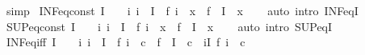 \begin{isabellebody}
\ simp%
\endisatagproof
{\isafoldproof}%
%
\isadelimproof
\isanewline
%
\endisadelimproof
\isanewline
{}\isamarkupfalse%
\ INF{\isacharunderscore}{\kern0pt}eq{\isacharunderscore}{\kern0pt}const{\isacharcolon}{\kern0pt}\ {\isachardoublequoteopen}I\ {\isasymnoteq}\ {\isacharbraceleft}{\kern0pt}{\isacharbraceright}{\kern0pt}\ {\isasymLongrightarrow}\ {\isacharparenleft}{\kern0pt}{\isasymAnd}i{\isachardot}{\kern0pt}\ i\ {\isasymin}\ I\ {\isasymLongrightarrow}\ f\ i\ {\isacharequal}{\kern0pt}\ x{\isacharparenright}{\kern0pt}\ {\isasymLongrightarrow}\ {\isasymSqinter}{\isacharparenleft}{\kern0pt}f\ {\isacharbackquote}{\kern0pt}\ I{\isacharparenright}{\kern0pt}\ {\isacharequal}{\kern0pt}\ x{\isachardoublequoteclose}\isanewline
%
\isadelimproof
\ \ %
\endisadelimproof
%
\isatagproof
{}\isamarkupfalse%
\ {\isacharparenleft}{\kern0pt}auto\ intro{\isacharcolon}{\kern0pt}\ INF{\isacharunderscore}{\kern0pt}eqI{\isacharparenright}{\kern0pt}%
\endisatagproof
{\isafoldproof}%
%
\isadelimproof
\isanewline
%
\endisadelimproof
\isanewline
{}\isamarkupfalse%
\ SUP{\isacharunderscore}{\kern0pt}eq{\isacharunderscore}{\kern0pt}const{\isacharcolon}{\kern0pt}\ {\isachardoublequoteopen}I\ {\isasymnoteq}\ {\isacharbraceleft}{\kern0pt}{\isacharbraceright}{\kern0pt}\ {\isasymLongrightarrow}\ {\isacharparenleft}{\kern0pt}{\isasymAnd}i{\isachardot}{\kern0pt}\ i\ {\isasymin}\ I\ {\isasymLongrightarrow}\ f\ i\ {\isacharequal}{\kern0pt}\ x{\isacharparenright}{\kern0pt}\ {\isasymLongrightarrow}\ {\isasymSqunion}{\isacharparenleft}{\kern0pt}f\ {\isacharbackquote}{\kern0pt}\ I{\isacharparenright}{\kern0pt}\ {\isacharequal}{\kern0pt}\ x{\isachardoublequoteclose}\isanewline
%
\isadelimproof
\ \ %
\endisadelimproof
%
\isatagproof
{}\isamarkupfalse%
\ {\isacharparenleft}{\kern0pt}auto\ intro{\isacharcolon}{\kern0pt}\ SUP{\isacharunderscore}{\kern0pt}eqI{\isacharparenright}{\kern0pt}%
\endisatagproof
{\isafoldproof}%
%
\isadelimproof
\isanewline
%
\endisadelimproof
\isanewline
{}\isamarkupfalse%
\ INF{\isacharunderscore}{\kern0pt}eq{\isacharunderscore}{\kern0pt}iff{\isacharcolon}{\kern0pt}\ {\isachardoublequoteopen}I\ {\isasymnoteq}\ {\isacharbraceleft}{\kern0pt}{\isacharbraceright}{\kern0pt}\ {\isasymLongrightarrow}\ {\isacharparenleft}{\kern0pt}{\isasymAnd}i{\isachardot}{\kern0pt}\ i\ {\isasymin}\ I\ {\isasymLongrightarrow}\ f\ i\ {\isasymle}\ c{\isacharparenright}{\kern0pt}\ {\isasymLongrightarrow}\ {\isasymSqinter}{\isacharparenleft}{\kern0pt}f\ {\isacharbackquote}{\kern0pt}\ I{\isacharparenright}{\kern0pt}\ {\isacharequal}{\kern0pt}\ c\ {\isasymlongleftrightarrow}\ {\isacharparenleft}{\kern0pt}{\isasymforall}i{\isasymin}I{\isachardot}{\kern0pt}\ f\ i\ {\isacharequal}{\kern0pt}\ c{\isacharparenright}{\kern0pt}{\isachardoublequoteclose}\isanewline

\end{isabellebody}
